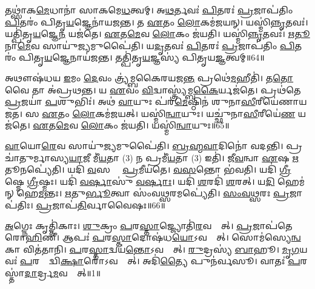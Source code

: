 𑌤𑌥𑍍𑌸𑌾॑𑌕\ul{𑌮𑍇}𑌧𑌾𑌨𑌾॑ 𑌸𑌾𑌕𑌮𑍇\ul{𑌧}𑌤𑍍𑌵𑌮𑍍।
𑌅\ul{𑌥}𑌰𑍍𑌤𑌵𑌃॑ \ul{𑌪𑌿}𑌤𑌰𑌃॑ \ul{𑌪𑍍𑌰}𑌜𑌾𑌪॑𑌤𑌿𑌂 \ul{𑌪𑌿}𑌤𑌰𑌂॑ 𑌪𑌿𑌤𑍃\ul{𑌯}𑌜𑍍𑌞𑍇𑌨𑌾॑𑌯𑌜𑌨𑍍𑌤।
𑌤 \ul{𑌏}𑌤𑌂 \ul{𑌲𑍋}𑌕𑌮॑𑌜𑌯𑌨𑍍।
𑌯𑌸𑍍𑌮𑌿॑\ul{𑌨𑍍𑌨𑍃}𑌤𑌵𑌃॑।
𑌯𑌤𑍍𑌪𑌿॑𑌤𑍃\ul{𑌯}𑌜𑍍𑌞𑍇\ul{𑌨} 𑌯𑌜॑𑌤𑍇।
\ul{𑌏}𑌤\ul{𑌮𑍇}𑌵 \ul{𑌲𑍋}𑌕𑌂 𑌜॑𑌯𑌤𑌿।
𑌯𑌸𑍍𑌮𑌿॑\ul{𑌨𑍍𑌨𑍃}𑌤𑌵𑌃॑।
\ul{𑌋}\ul{𑌤𑍂}𑌨𑌾\ul{𑌮𑍇}𑌵 𑌸𑌾𑌯𑍁॑\ul{𑌜𑍍𑌯}𑌮𑍁𑌪𑍈॑𑌤𑌿।
𑌯\ul{𑌦𑍃}𑌤𑌵𑌃॑ \ul{𑌪𑌿}𑌤𑌰𑌃॑ \ul{𑌪𑍍𑌰}𑌜𑌾𑌪॑𑌤𑌿𑌂 \ul{𑌪𑌿}𑌤𑌰𑌂॑ 𑌪𑌿𑌤𑍃\ul{𑌯}𑌜𑍍𑌞𑍇𑌨𑌾𑌯॑𑌜𑌨𑍍𑌤।
𑌤𑌤𑍍𑌪𑌿॑𑌤𑍃\ul{𑌯}𑌜𑍍𑌞𑌸𑍍𑌯॑ 𑌪𑌿𑌤𑍃𑌯\ul{𑌜𑍍𑌞}𑌤𑍍𑌵𑌮𑍍॥64॥

𑌅𑌥𑍗𑌷॑𑌧𑌯 \ul{𑌇}𑌮𑌂 \ul{𑌦𑍇}𑌵𑌂 𑌤𑍍𑌰𑍍𑌯॑𑌮𑍍𑌬𑌕𑍈𑌰𑌯𑌜\ul{𑌨𑍍𑌤} 𑌪𑍍𑌰𑌥𑍇॑\ul{𑌮}𑌹𑍀𑌤𑌿॑।
𑌤\ul{𑌤𑍋} 𑌵𑍈 𑌤𑌾 𑌅॑𑌪𑍍𑌰𑌥𑌨𑍍𑌤।
𑌯 \ul{𑌏}𑌵𑌂 \ul{𑌵𑌿}𑌦𑍍𑌵𑌾𑌸𑍍𑌤𑍍𑌰𑍍𑌯॑𑌮𑍍𑌬\ul{𑌕𑍈}𑌰𑍍𑌯𑌜॑𑌤𑍇।
𑌪𑍍𑌰𑌥॑𑌤𑍇 \ul{𑌪𑍍𑌰}𑌜𑌯𑌾॑ \ul{𑌪}𑌶𑍁𑌭𑌿𑌃॑।
𑌅𑌥॑ \ul{𑌵𑌾}𑌯𑍁𑌃 𑌪॑𑌰\ul{𑌮𑍇}𑌷𑍍𑌠𑌿𑌨॑ 𑌶𑍁𑌨𑌾\ul{𑌸𑍀}𑌰𑍀𑌯𑍇॑𑌣𑌾𑌯𑌜𑌤।
𑌸 \ul{𑌏}𑌤𑌂 \ul{𑌲𑍋}𑌕𑌮॑𑌜𑌯𑌤𑍍।
𑌯𑌸𑍍𑌮𑌿॑\ul{𑌨𑍍𑌵𑌾}𑌯𑍁𑌃।
𑌯𑌚𑍍𑌛𑍁॑𑌨𑌾\ul{𑌸𑍀}𑌰𑍀𑌯𑍇॑\ul{𑌣} 𑌯𑌜॑𑌤𑍇।
\ul{𑌏}𑌤\ul{𑌮𑍇}𑌵 \ul{𑌲𑍋}𑌕𑌂 𑌜॑𑌯𑌤𑌿।
𑌯𑌸𑍍𑌮𑌿॑\ul{𑌨𑍍𑌵𑌾}𑌯𑍁𑌃॥65॥

\ul{𑌵𑌾}𑌯𑍋\ul{𑌰𑍇}𑌵 𑌸𑌾𑌯𑍁॑\ul{𑌜𑍍𑌯}𑌮𑍁𑌪𑍈॑𑌤𑌿।
\ul{𑌬𑍍𑌰}\ul{𑌹𑍍𑌮}\ul{𑌵𑌾}𑌦𑌿𑌨𑍋॑ 𑌵𑌦𑌨𑍍𑌤𑌿।
𑌪𑍍𑌰 𑌚𑌾॑𑌤𑍁𑌰𑍍𑌮𑌾𑌸𑍍𑌯\ul{𑌯𑌾}𑌜𑍀 𑌮𑍀॑\ul{𑌯}𑌤𑌾 (3) 𑌨 𑌪𑍍𑌰𑌮𑍀॑\ul{𑌯}𑌤𑌾 (3) 𑌇𑌤𑌿॑।
𑌜𑍀\ul{𑌵}𑌨𑍍𑌵𑌾 \ul{𑌏}𑌷 \ul{𑌋}𑌤𑍂𑌨𑌪𑍍𑌯𑍇॑𑌤𑌿।
𑌯𑌦𑌿॑ \ul{𑌵}𑌸𑌨𑍍𑌤𑌾᳚ \ul{𑌪𑍍𑌰}𑌮𑍀𑌯॑𑌤𑍇।
\ul{𑌵}\ul{𑌸}𑌨𑍍𑌤𑍋 𑌭॑𑌵𑌤𑌿।
𑌯𑌦𑌿॑ \ul{𑌗𑍍𑌰𑍀}𑌷𑍍𑌮𑍇 \ul{𑌗𑍍𑌰𑍀}𑌷𑍍𑌮𑌃।
𑌯𑌦𑌿॑ \ul{𑌵}\ul{𑌰𑍍}𑌷𑌾𑌸𑍁॑ \ul{𑌵}\ul{𑌰𑍍}𑌷𑌾𑌃।
𑌯𑌦𑌿॑ \ul{𑌶}𑌰𑌦𑌿॑ \ul{𑌶}𑌰𑌤𑍍।
𑌯\ul{𑌦𑌿} 𑌹𑍇𑌮॑𑌨𑍍 𑌹𑍇\ul{𑌮}𑌨𑍍𑌤𑌃।
\ul{𑌋}𑌤𑍁\ul{𑌰𑍍𑌭𑍂}𑌤𑍍𑌵𑌾 𑌸𑌂॑𑌵\ul{𑌥𑍍𑌸}𑌰𑌮𑌪𑍍𑌯𑍇॑𑌤𑌿।
\ul{𑌸𑌂}\ul{𑌵}\ul{𑌥𑍍𑌸}𑌰𑌃 \ul{𑌪𑍍𑌰}𑌜𑌾𑌪॑𑌤𑌿𑌃।
\ul{𑌪𑍍𑌰}𑌜𑌾𑌪॑\ul{𑌤𑌿}𑌰𑍍𑌵𑌾𑌵𑍈𑌷𑌃॥66॥






\clearpage
{}
\setcounter{anuvakam}{0}

\ul{𑌅}𑌗𑍍𑌨𑍇𑌃 𑌕𑍃𑌤𑍍𑌤𑌿॑𑌕𑌾𑌃।
\ul{𑌶𑍁}𑌕𑍍𑌰𑌂 \ul{𑌪}𑌰\ul{𑌸𑍍𑌤𑌾}𑌜𑍍𑌜𑍍𑌯𑍋𑌤𑌿॑\ul{𑌰}𑌵𑌸𑍍𑌤𑌾᳚𑌤𑍍।
\ul{𑌪𑍍𑌰}𑌜𑌾𑌪॑𑌤𑍇 𑌰𑍋\ul{𑌹𑌿}𑌣𑍀।
𑌆𑌪𑌃॑ \ul{𑌪}𑌰\ul{𑌸𑍍𑌤𑌾}𑌦𑍋𑌷॑𑌧\ul{𑌯𑍋}\-𑌽𑌵𑌸𑍍𑌤𑌾᳚𑌤𑍍।
𑌸𑍋𑌮॑𑌸𑍍𑌯𑍇\ul{𑌨𑍍𑌵}𑌕𑌾 𑌵𑌿𑌤॑𑌤𑌾𑌨𑌿।
\ul{𑌪}𑌰\ul{𑌸𑍍𑌤𑌾}𑌦𑍍𑌵𑌯॑\ul{𑌨𑍍𑌤𑍋}\-𑌽𑌵𑌸𑍍𑌤𑌾᳚𑌤𑍍।
\ul{𑌰𑍁}𑌦𑍍𑌰𑌸𑍍𑌯॑ \ul{𑌬𑌾}𑌹𑍂।
\ul{𑌮𑍃}\ul{𑌗}𑌯𑌵𑌃॑ \ul{𑌪}𑌰𑌸𑍍𑌤𑌾᳚𑌦𑍍𑌵𑌿\ul{𑌕𑍍𑌷𑌾}𑌰𑍋॑\-𑌽𑌵𑌸𑍍𑌤𑌾᳚𑌤𑍍।
𑌅𑌦𑌿॑\ul{𑌤𑍍𑌯𑍈} 𑌪𑍁𑌨॑𑌰𑍍𑌵𑌸𑍂।
𑌵𑌾𑌤𑌃॑ \ul{𑌪}𑌰𑌸𑍍𑌤𑌾॑\ul{𑌦𑌾}𑌰𑍍𑌦𑍍𑌰\ul{𑌮}𑌵𑌸𑍍𑌤𑌾᳚𑌤𑍍॥1॥

